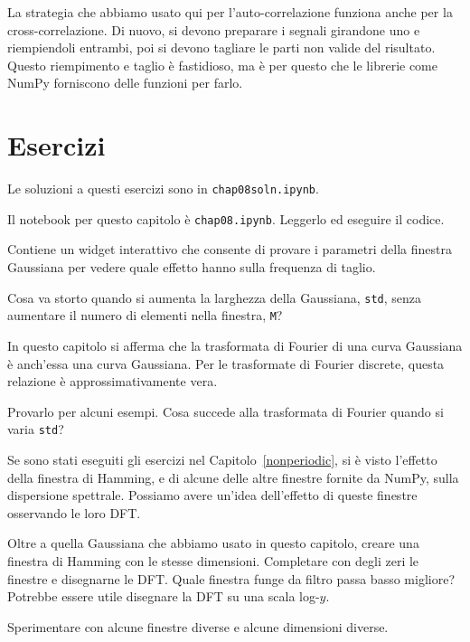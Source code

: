 \documentclass[12pt]{book} \usepackage[width=5.5in,height=8.5in, hmarginratio=3:2,vmarginratio=1:1]{geometry}
\begin{document}
La strategia che abbiamo usato qui per l'auto-correlazione funziona anche per la cross-correlazione. Di nuovo, si devono preparare i segnali girandone uno e riempiendoli entrambi, poi si devono tagliare le parti non valide del risultato. Questo riempimento e taglio è fastidioso, ma è per questo che le librerie come NumPy forniscono delle funzioni per farlo.

\section{Esercizi} 

Le soluzioni a questi esercizi sono in {\tt chap08soln.ipynb}.

\begin{exercise} Il notebook per questo capitolo è {\tt chap08.ipynb}. Leggerlo ed eseguire il codice.

Contiene un widget interattivo che consente di provare i parametri della finestra Gaussiana per vedere quale effetto hanno sulla frequenza di taglio.

Cosa va storto quando si aumenta la larghezza della Gaussiana, {\tt std}, senza aumentare il numero di elementi nella finestra, {\tt M}? \end{exercise} 

\begin{exercise} In questo capitolo si afferma che la trasformata di Fourier di una curva Gaussiana è anch'essa una curva Gaussiana. Per le trasformate di Fourier discrete, questa relazione è approssimativamente vera.

Provarlo per alcuni esempi. Cosa succede alla trasformata di Fourier quando si varia {\tt std}? \end{exercise} 

\begin{exercise} Se sono stati eseguiti gli esercizi nel Capitolo~\ref{nonperiodic}, si è visto l'effetto della finestra di Hamming, e di alcune delle altre finestre fornite da NumPy, sulla dispersione spettrale. Possiamo avere un'idea dell'effetto di queste finestre osservando le loro DFT.

Oltre a quella Gaussiana che abbiamo usato in questo capitolo, creare una finestra di Hamming con le stesse dimensioni. Completare con degli zeri le finestre e disegnarne le DFT. Quale finestra funge da filtro passa basso migliore? Potrebbe essere utile disegnare la DFT su una scala log-$y$.

Sperimentare con alcune finestre diverse e alcune dimensioni diverse. \end{exercise} 
\end{document}
